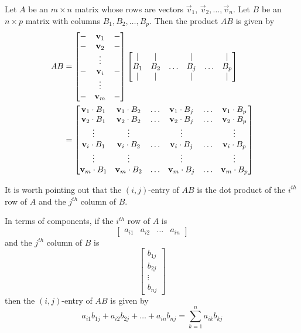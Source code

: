 \documentclass{ximera}
\begin{document}
\begin{definition}\label{def:matmatproduct} Let $A$ be an $m\times n$ matrix whose rows are vectors $\vec{v}_1$, $\vec{v}_2,\ldots ,\vec{v}_n$.  Let $B$ be an $n\times p$ matrix with columns $B_1, B_2, \ldots, B_p$.  Then the product $AB$ is given by
\begin{align*}AB&=\begin{bmatrix}-&{\bf v}_1&-\\-&{\bf v}_2&-\\ &\vdots & \\-&{\bf v}_i &-\\ &\vdots& \\-&{\bf v}_m&-\end{bmatrix}\begin{bmatrix}|&|&&|&&|\\B_1& B_2 &\ldots  & B_j&\ldots& B_p\\|&|&&|&&|\end{bmatrix}\\ &=\begin{bmatrix}{\bf v}_1\cdot B_1&{\bf v}_1\cdot B_2&\ldots&{\bf v}_1\cdot B_j&\ldots &{\bf v}_1\cdot B_p\\{\bf v}_2\cdot B_1&{\bf v}_2\cdot B_2&\ldots&{\bf v}_2\cdot B_j&\ldots &{\bf v}_2\cdot B_p\\\vdots&\vdots&&\vdots&&\vdots\\{\bf v}_i\cdot B_1&{\bf v}_i\cdot B_2&\ldots&{\bf v}_i\cdot B_j&\ldots &{\bf v}_i\cdot B_p\\\vdots&\vdots&&\vdots&&\vdots\\{\bf v}_m\cdot B_1&{\bf v}_m\cdot B_2&\ldots&{\bf v}_m\cdot B_j&\ldots &{\bf v}_m\cdot B_p\end{bmatrix}
\end{align*}
\end{definition}

It is worth pointing out that the $(i,j)$-entry of $AB$ is the dot product of the $i^{th}$ row of $A$ and the $j^{th}$ column of $B$.  

In terms of components, if the $i^{th}$ row of $A$ is $$\begin{bmatrix}a_{i1}& a_{i2} &\ldots &a_{in}\end{bmatrix}$$ and the $j^{th}$ column of $B$ is 
$$\begin{bmatrix}b_{1j}\\b_{2j}\\\vdots\\b_{nj}\end{bmatrix}$$
then the $(i,j)$-entry of $AB$ is given by
\begin{equation}\label{eq:ijentrymatrixproduct}a_{i1}b_{1j}+a_{i2}b_{2j}+\dots +a_{in}b_{nj}=\sum_{k=1}^na_{ik}b_{kj}
\end{equation}
\end{document}
